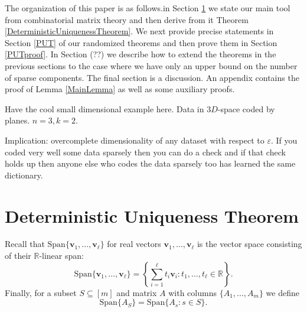 \documentclass[journal, onecolumn]{IEEEtran}
\begin{document}
The organization of this paper is as follows.in Section \ref{DUT} we state our main tool from combinatorial matrix theory and then derive from it Theorem \ref{DeterministicUniquenessTheorem}. We next provide precise statements in Section \ref{PUT} of our randomized theorems and then prove them in Section \ref{PUTproof}. In Section (??) we describe how to extend the theorems in the previous sections to the case where we have only an upper bound on the number of sparse components. The final section is a discussion. An appendix contains the proof of Lemma \ref{MainLemma} as well as some auxiliary proofs. 

Have the cool small dimensional example here. Data in $3D$-space coded by planes. $n=3, k=2$. 

Implication: overcomplete dimensionality of any dataset with respect to $\varepsilon$. If you coded very well some data sparsely then you can do a check and if that check holds up then anyone else who codes the data sparsely too has learned the same dictionary. 
 

\section{Deterministic Uniqueness Theorem}\label{DUT}

Recall that $\text{Span}\{\mathbf{v}_1, \ldots, \mathbf{v}_\ell\}$ for real vectors $\mathbf{v}_1, \ldots, \mathbf{v}_\ell$ is the vector space consisting of their $\mathbb{R}$-linear span:
%
\[ \text{Span}\{\mathbf{v}_1, \ldots, \mathbf{v}_\ell\} = \left\{ \sum_{i=1}^\ell t_i\mathbf{v}_i : t_1, \ldots, t_\ell \in \mathbb{R}\right\}. \]
%
Finally, for a subset $S \subseteq [m]$ and matrix $A$ with columns $\{A_1,...,A_m\}$ we define
%
\[ \text{Span}\{A_S\} = \text{Span}\{A_s: s \in S\}. \]

\end{document}

